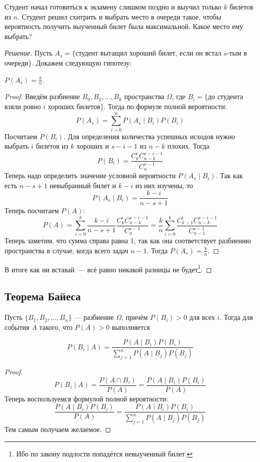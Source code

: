 \documentclass[a4paper,12pt]{article}
\begin{document}
	\begin{problem}
		Студент начал готовиться к экзамену слишком поздно и выучил только \(k\) билетов из \(n\). Студент решил схитрить и выбрать место в очереди такое, чтобы вероятность получить выученный билет была максимальной. Какое место ему выбрать?
	\end{problem}
	\begin{proof}[Решение]
		Пусть \(A_{s} = \{\)студент вытащил хороший билет, если он встал \(s\)-тым в очереди\(\}\). Докажем следующую гипотезу:
		\begin{hypothesis}
			\(P(A_{s}) = \frac{k}{n}\).
		\end{hypothesis}
		\begin{proof}
			Введём разбиение \(B_{0}, B_{1}, \ldots, B_{k}\) пространства \(\Omega\), где \(B_{i} = \{\)до студента взяли ровно \(i\) хороших билетов\(\}\).
			Тогда по формуле полной вероятности:
			\[P(A_{s}) = \sum\limits_{i = 0}^{k} P(A_{s} \mid B_{i})P(B_{i})\]
			Посчитаем \(P(B_{i})\). Для определения количества успешных исходов нужно выбрать \(i\) билетов из \(k\) хороших и \(s - i - 1\) из \(n - k\) плохих. Тогда
			\[P(B_{i}) = \frac{C_{k}^{i} C_{n - k}^{s - i - 1}}{C_{n}^{s - 1}}\]
			Теперь надо определить значение условной вероятности \(P(A_{s} \mid B_{i})\). Так как есть \(n - s + 1\) невыбранный билет и \(k - i\) из них изучены, то \[P(A_{s} \mid B_{i}) = \frac{k - i}{n - s + 1}\]
			Теперь посчитаем \(P(A)\):
			\[P(A) =  \sum\limits_{i = 0}^{k} \frac{k - i}{n - s + 1} \frac{C_{k}^{i} C_{n - k}^{s - i - 1}}{C_{n}^{s - 1}} =\frac{k}{n} \sum\limits_{i = 0}^{k} \frac{C_{k - 1}^{i} C_{n - k}^{s - i - 1}}{C_{n - 1}^{s - 1}}\]
			Теперь заметим, что сумма справа равна 1, так как она соответствует разбиению пространства в случае, когда всего задач \(n - 1\). Тогда \(P(A_{s}) = \frac{k}{n}\).
		\end{proof}
		В итоге как ни вставай~--- всё равно никакой разницы не будет\footnote{Ибо по закону подлости попадётся невыученный билет.}.
	\end{proof}
	
	\subsection{Теорема Байеса}
	\begin{theorem}
		Пусть \(\{B_{1}, B_{2}, \ldots, B_{n}\}\) --- разбиение \(\Omega\), причём \(P(B_i) > 0\) для всех \(i\). Тогда для события \(A\) такого, что \(P(A) > 0\) выполняется
		
		\[P(B_i \mid A) = \frac{P(A\mid B_i) P(B_i)}{\sum\limits_{j = 1}^{n} P(A\mid B_j) P(B_j)}\]
	\end{theorem}
	\begin{proof}
		\[P(B_i\mid A) = \frac{P(A\cap B_i)}{P(A)} = \frac{P(A\mid B_i) P(B_i)}{P(A)}\]
		Теперь воспользуемся формулой полной вероятности:
		\[\frac{P(A\mid B_i) P(B_i)}{P(A)} = \frac
		{P(A\mid B_i) P(B_i)}
		{\sum\limits_{j=1}^{n}P(A\mid B_j) P(B_j)}\]
		Тем самым получаем желаемое.
	\end{proof}
	
\end{document}
